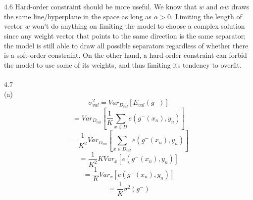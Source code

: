 \documentclass[12pt]{article}
\begin{document}
\\\\%
4.6 Hard-order constraint should be more useful. We know that $w$ and $\alpha w$ draws the same line/hyperplane in the space as long as $\alpha>0$. Limiting the length of vector $w$ won't do anything on limiting the model to choose a complex solution since any weight vector that points to the same direction is the same separator; the model is still able to draw all possible separators regardless of whether there is a soft-order constraint. On the other hand, a hard-order constraint can forbid the model to use some of its weights, and thus limiting its tendency to overfit. \\\\
4.7\\
(a)\\ 
$$\sigma^2_{val} = Var_{D_{val}}[E_{val}(g^-)]$$
$$=Var_{D_{val}}[\frac{1}{K}\sum_{x\in D_{}} e(g^-(x_n),y_n)]$$
$$=\frac{1}{K^2}Var_{D_{val}}[\sum_{x\in D_{val}} e(g^-(x_n),y_n)]$$
$$=\frac{1}{K^2}KVar_x[e(g^-(x_n),y_n)]$$
$$=\frac{1}{K}Var_{x}[e(g^-(x_n),y_n)]$$
$$=\frac{1}{K}\sigma^2(g^-)$$
\end{document}
